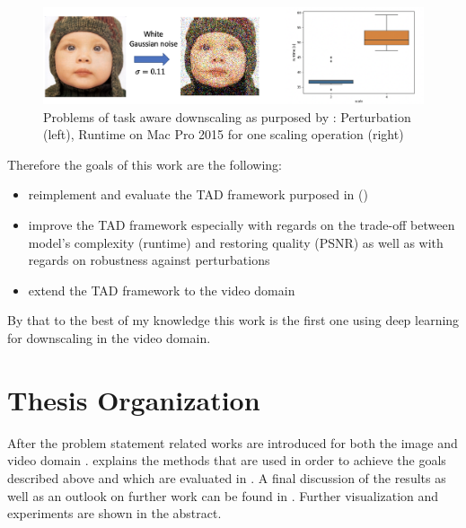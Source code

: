 \begin{figure}[!htbp]
\centering
\includegraphics[width=14cm]{figures/taid_problems.png}
\caption{Problems of task aware downscaling as purposed by \cite{TAID}:
Perturbation (left), Runtime on Mac Pro 2015 for one scaling operation (right)}
\label{fig:taid_problems}
\end{figure}

Therefore the goals of this work are the following:

\begin{itemize}
\item reimplement and evaluate the \ac{TAD} framework purposed in (\cite{TAID})
\item improve the \ac{TAD} framework especially with regards on the trade-off between model's complexity (runtime) and restoring quality (PSNR) as well as with regards on robustness against perturbations
\item extend the \ac{TAD} framework to the video domain
\end{itemize}

By that to the best of my knowledge this work is the first one using deep
learning for downscaling in the video domain.

\section{Thesis Organization}
After the problem statement  related works are introduced for both the image and video domain .  explains the methods that are used in order to achieve the goals described above and which are evaluated in . A final discussion of the results as well as an outlook on further work can be found in . Further visualization and experiments are shown in the abstract.

